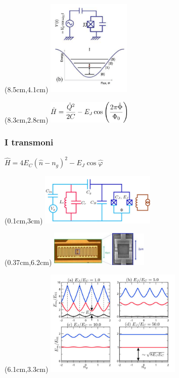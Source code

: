 \documentclass[10pt]{beamer}
\begin{document}
\begin{frame}
\begin{textblock*}{4cm}(8.5cm,4.1cm) %
\includegraphics[width=4cm]{img3/JJ_energy.png}
\end{textblock*}


\begin{textblock*}{4cm}(8.3cm,2.8cm) %
\includegraphics[width=4cm]{img3/HJJ_new.png}
\end{textblock*}


\end{frame}


\begin{frame}[t]
\frametitle{I transmoni}

\centering
\Large $\hat{H}=4E_C(\hat{n}-n_g)^2 - E_J\cos\hat{\varphi}$



\begin{textblock*}{6cm}(0.1cm,3cm) %
\includegraphics[width=5.5cm]{img4/trasmon.png}
\end{textblock*}


\begin{textblock*}{5.5cm}(0.37cm,6.2cm) %
\includegraphics[width=4.7cm]{img4/transmon_SEM.jpg}
\end{textblock*}

\begin{textblock*}{6.5cm}(6.1cm,3.3cm) %
\includegraphics[width=6.5cm]{img4/EJEC.png}
\end{textblock*}


\end{frame}
\end{document}
